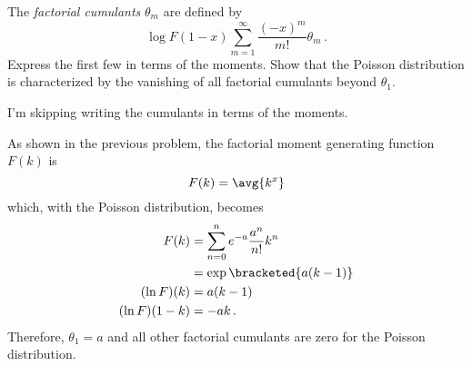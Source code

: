 

The \emph{factorial cumulants} $\theta_m$ are defined by
\begin{equation*}
  \log F(1 - x) \sum_{m=1}^\infty \frac{(-x)^m}{m!} \theta_m
  \, .
\end{equation*}
Express the first few in terms of the moments.
Show that the Poisson distribution is characterized by the vanishing of all factorial cumulants beyond $\theta_1$.


I'm skipping writing the cumulants in terms of the moments.

As shown in the previous problem, the factorial moment generating function $F(k)$ is
\begin{equation*}
  F(k) = \avg{k^x}
\end{equation*}
which, with the Poisson distribution, becomes
\begin{align*}
  F(k)
  &= \sum_{n=0}^n e^{-a} \frac{a^n}{n!} k^n \\
  &= \exp \bracketed{a(k-1)} \\
  (\ln F)(k)
  &= a (k - 1) \\
  (\ln F)(1 - k)
  &= -a k \, .
\end{align*}
Therefore, $\theta_1 = a$ and all other factorial cumulants are zero for the Poisson distribution.
